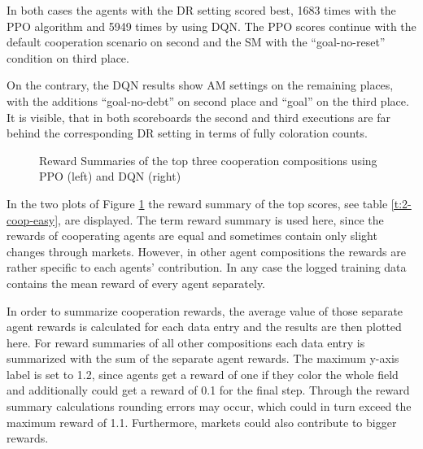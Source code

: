 In both cases the agents with the DR setting scored best, 1683 times with the PPO algorithm and 5949 times by using DQN. The PPO scores continue with the default cooperation scenario on second and the SM with the ``goal-no-reset'' condition on third place. 

On the contrary, the DQN results show AM settings on the remaining places, with the additions ``goal-no-debt'' on second place and ``goal'' on the third place. It is visible, that in both scoreboards the second and third executions are far behind the corresponding DR setting in terms of fully coloration counts.

\begin{figure}[hpbt]
    \centering
    \hspace{0.01\textwidth}
    \caption[Reward Summaries of the Top Cooperation Modes in a 5x5 Environment]{Reward Summaries of the top three cooperation compositions using PPO (left) and DQN (right)}
    \label{fig:multipic_plots_coop_easy} %
\end{figure}

In the two plots of Figure \ref{fig:multipic_plots_coop_easy} the reward summary of the top scores, see table \ref{t:2-coop-easy}, are displayed. The term reward summary is used here, since the rewards of cooperating agents are equal and sometimes contain only slight changes through markets. However, in other agent compositions the rewards are rather specific to each agents' contribution. In any case the logged training data contains the mean reward of every agent separately. 

In order to summarize cooperation rewards, the average value of those separate agent rewards is calculated for each data entry and the results are then plotted here. For reward summaries of all other compositions each data entry is summarized with the sum of the separate agent rewards. The maximum y-axis label is set to 1.2, since agents get a reward of one if they color the whole field and additionally could get a reward of 0.1 for the final step. Through the reward summary calculations rounding errors may occur, which could in turn exceed the maximum reward of 1.1. Furthermore, markets could also contribute to bigger rewards. 

